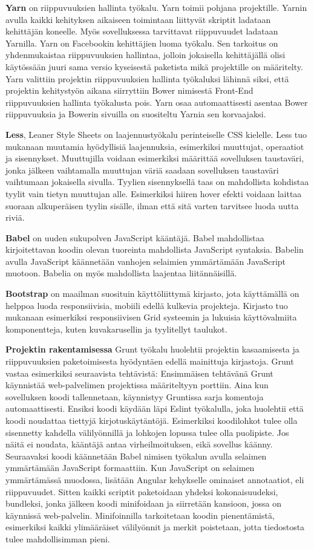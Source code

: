 \documentclass{tktltiki}
\begin{document}
\textbf{Yarn} on riippuvuuksien hallinta työkalu. Yarn toimii pohjana projektille. Yarnin avulla kaikki kehityksen aikaiseen toimintaan liittyvät skriptit ladataan kehittäjän koneelle. Myös sovelluksessa tarvittavat riippuvuudet ladataan Yarnilla. Yarn on Facebookin kehittäjien luoma työkalu. Sen tarkoitus on yhdenmukaistaa riippuvuuksien hallintaa, jolloin jokaisella kehittäjällä olisi käytössään juuri sama versio kyseisestä paketista mikä projektille on määritelty. Yarn valittiin projektin riippuvuuksien hallinta työkaluksi lähinnä siksi, että projektin kehitystyön aikana siirryttiin Bower nimisestä Front-End riippuvuuksien hallinta työkalusta pois. Yarn osaa automaattisesti asentaa Bower riippuvuuksia ja Bowerin sivuilla on suositeltu Yarnia sen korvaajaksi. 

\textbf{Less}, Leaner Style Sheets on laajennustyökalu perinteiselle CSS kielelle. Less tuo mukanaan muutamia hyödyllisiä laajennuksia, esimerkiksi muuttujat, operaatiot ja sisennykset. Muuttujilla voidaan esimerkiksi määrittää sovelluksen taustaväri, jonka jälkeen vaihtamalla muuttujan väriä saadaan sovelluksen taustaväri vaihtumaan jokaisella sivulla. Tyylien sisennyksellä taas on mahdollista kohdistaa tyylit vain tietyn muuttujan alle. Esimerkiksi hiiren hover efekti voidaan laittaa suoraan alkuperäisen tyylin sisälle, ilman että sitä varten tarvitsee luoda uutta riviä.

\textbf{Babel} on uuden sukupolven JavaScript kääntäjä. Babel mahdollistaa kirjoitettavan koodin olevan tuoreinta mahdollista JavaScript syntaksia. Babelin avulla JavaScript käännetään vanhojen selaimien ymmärtämään JavaScript muotoon. Babelia on myös mahdollista laajentaa liitännäisillä.

\textbf{Bootstrap} on maailman suosituin käyttöliittymä kirjasto, jota käyttämällä on helppoa luoda responsiivisia, mobiili edellä kulkevia projekteja. Kirjasto tuo mukanaan esimerkiksi responsiivisen Grid systeemin ja lukuisia käyttövalmiita komponentteja, kuten kuvakarusellin ja tyylitellyt taulukot. 

\textbf{Projektin rakentamisessa} Grunt työkalu huolehtii projektin kasaamisesta ja riippuvuuksien paketoimisesta hyödyntäen edellä mainittuja kirjastoja. Grunt vastaa esimerkiksi seuraavista tehtävistä: Ensimmäisen tehtävänä Grunt käynnistää web-palvelimen projektissa määriteltyyn porttiin. Aina kun sovelluksen koodi tallennetaan, käynnistyy Gruntissa sarja komentoja automaattisesti. Ensiksi koodi käydään läpi Eslint työkalulla, joka huolehtii että koodi noudattaa tiettyjä kirjotuskäytäntöjä. Esimerkiksi koodilohkot tulee olla sisennetty kahdella välilyönnillä ja lohkojen lopussa tulee olla puolipiste. Jos näitä ei noudata, kääntäjä antaa virheilmoituksen, eikä sovellus käänny. Seuraavaksi koodi käännetään Babel nimisen työkalun avulla selaimen ymmärtämään JavaScript formaattiin. Kun JavaScript on selaimen ymmärtämässä muodossa, lisätään Angular kehykselle ominaiset annotaatiot, eli riippuvuudet. Sitten kaikki scriptit paketoidaan yhdeksi kokonaisuudeksi, bundleksi, jonka jälkeen koodi minifoidaan ja siirretään kansioon, jossa on käynnissä web-palvelin. Minifoinnilla tarkoitetaan koodin pienentämistä, esimerkiksi kaikki ylimääräiset välilyönnit ja merkit poistetaan, jotta tiedostosta tulee mahdollisimman pieni.
\end{document}
